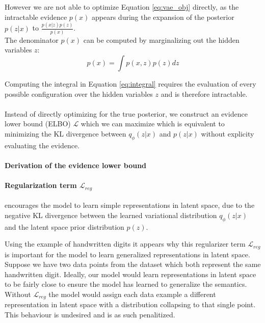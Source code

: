 However we are not able to optimize Equation \ref{eq:vae_obj} directly, as the intractable evidence $p(x)$ appears during the expansion of the posterior $p(z|x)$ to $\frac{p(x|z)p(z)}{p(x)}$.\\
The denominator $p(x)$ can be computed by marginalizing out the hidden variables $z$: 
\begin{equation}
  \label{eq:integral}
p(x) = \int p(x,z) p(z) dz
\end{equation}

Computing the integral in Equation \ref{eq:integral} requires the evaluation of every possible configuration over the hidden variables $z$ and is therefore intractable.\\\\

Instead of directly optimizing for the true posterior, we construct an evidence lower bound (ELBO) $\mathcal{L}$ which we can maximize which is equivalent to minimizing the KL divergence between $q_\phi(z|x)$ and $p(z|x)$ without explicity evaluating the evidence.\\



\paragraph{Derivation of the evidence lower bound}



\paragraph{Regularization term $\mathcal{L}_{reg}$} encourages the model to learn simple representations in latent space, due to the negative KL divergence between the learned variational distribution $q_\phi(z|x)$ and the latent space prior distribution $p(z)$.


Using the example of handwritten digits it appears why this regularizer term $\mathcal{L}_{reg}$ is important for the model to learn generalized representations in latent space.
Suppose we have two data points from the dataset which both represent the same handwritten digit.
Ideally, our model would learn representations in latent space to be fairly close to ensure the model has learned to generalize the semantics. Without $\mathcal{L}_{reg}$ the model would assign each data example a different representation in latent space with a distribution collapsing to that single point. This behaviour is undesired and is as such penalitized.

